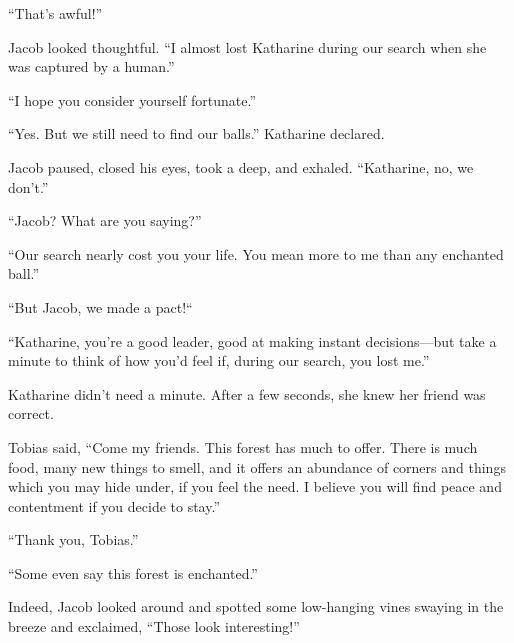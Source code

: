 “That's awful!”

Jacob looked thoughtful. “I almost lost Katharine during our search when she was captured by a human.”

“I hope you consider yourself fortunate.”

“Yes. But we still need to find our balls.” Katharine declared.

Jacob paused, closed  his eyes, took a deep, and exhaled. “Katharine, no, we don't.”

“Jacob? What are you saying?”

“Our search nearly cost you your life. You mean more to me than any enchanted ball.”

“But Jacob, we made a pact!“

“Katharine, you're a good leader, good at making instant decisions—but take a minute to think of how you'd feel if, during our search, you lost me.”

Katharine didn't need a minute. After a few seconds, she knew her friend was correct.

Tobias said, “Come my friends. This forest has much to offer. There is much food, many new things to smell, and it offers an abundance of corners and things which you may hide under, if you feel the  need. I believe you will find peace and contentment if you decide to stay.”

“Thank you, Tobias.”

“Some even say this forest is enchanted.”

Indeed, Jacob looked around and spotted some low-hanging vines swaying in the breeze and exclaimed, “Those look interesting!”